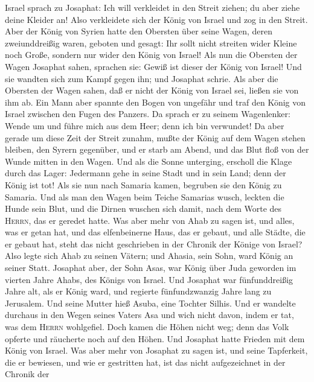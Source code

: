 Israel sprach zu Josaphat: Ich will verkleidet in den Streit ziehen; du
aber ziehe deine Kleider an! Also verkleidete sich der König von Israel
und zog in den Streit.  Aber der König von Syrien hatte
den Obersten über seine Wagen, deren zweiunddreißig waren, geboten und
gesagt: Ihr sollt nicht streiten wider Kleine noch Große, sondern nur
wider den König von Israel!  Als nun die Obersten der
Wagen Josaphat sahen, sprachen sie: Gewiß ist dieser der König von
Israel! Und sie wandten sich zum Kampf gegen ihn; und Josaphat schrie.
 Als aber die Obersten der Wagen sahen, daß er nicht der
König von Israel sei, ließen sie von ihm ab.  Ein Mann
aber spannte den Bogen von ungefähr und traf den König von Israel
zwischen den Fugen des Panzers. Da sprach er zu seinem Wagenlenker:
Wende um und führe mich aus dem Heer; denn ich bin verwundet!
 Da aber gerade um diese Zeit der Streit zunahm, mußte
der König auf dem Wagen stehen bleiben, den Syrern gegenüber, und er
starb am Abend, und das Blut floß von der Wunde mitten in den Wagen.
 Und als die Sonne unterging, erscholl die Klage durch
das Lager: Jedermann gehe in seine Stadt und in sein Land; denn der
König ist tot!  Als sie nun nach Samaria kamen, begruben
sie den König zu Samaria.  Und als man den Wagen beim
Teiche Samarias wusch, leckten die Hunde sein Blut, und die Dirnen
wuschen sich damit, nach dem Worte des \textsc{Herrn}, das er geredet
hatte.  Was aber mehr von Ahab zu sagen ist, und alles,
was er getan hat, und das elfenbeinerne Haus, das er gebaut, und alle
Städte, die er gebaut hat, steht das nicht geschrieben in der Chronik
der Könige von Israel?  Also legte sich Ahab zu seinen
Vätern; und Ahasia, sein Sohn, ward König an seiner Statt.
 Josaphat aber, der Sohn Asas, war König über Juda
geworden im vierten Jahre Ahabs, des Königs von Israel. 
Und Josaphat war fünfunddreißig Jahre alt, als er König ward, und
regierte fünfundzwanzig Jahre lang zu Jerusalem. Und seine Mutter hieß
Asuba, eine Tochter Silhis.  Und er wandelte durchaus in
den Wegen seines Vaters Asa und wich nicht davon, indem er tat, was dem
\textsc{Herrn} wohlgefiel. Doch kamen die Höhen nicht weg; denn das Volk
opferte und räucherte noch auf den Höhen.  Und Josaphat
hatte Frieden mit dem König von Israel.  Was aber mehr
von Josaphat zu sagen ist, und seine Tapferkeit, die er bewiesen, und
wie er gestritten hat, ist das nicht aufgezeichnet in der Chronik der
